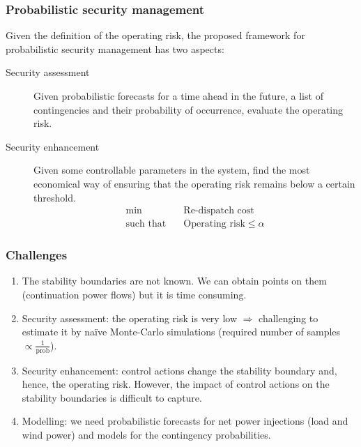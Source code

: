 \documentclass{beamer}
\begin{document}
\begin{frame}
\end{frame}

\begin{frame}
  \frametitle{Probabilistic security management}
  Given the definition of the operating risk, the proposed framework for probabilistic security management has two aspects:
  \begin{description}
  \item[Security assessment] Given probabilistic forecasts for a time ahead in the future, a list of contingencies and their probability of occurrence, evaluate the operating risk.
  \item[Security enhancement] Given some controllable parameters in the system, find the most economical way of ensuring that the operating risk remains below a certain threshold. 
    \begin{align*}
      \min \quad & \text{Re-dispatch cost} \\
      \text{such that} \quad & \text{Operating risk} \leq \alpha
    \end{align*}
  \end{description}
\end{frame}

\begin{frame}
  \frametitle{Challenges}
  \begin{enumerate}
  \item The stability boundaries are not known. We can obtain points on them (continuation power flows) but it is time consuming.
  \item Security assessment: the operating risk is very low $\Rightarrow$ challenging to estimate it by naïve Monte-Carlo simulations (required number of samples $\propto \frac{1}{\text{prob}}$).
  \item Security enhancement: control actions change the stability boundary and, hence, the operating risk. However, the impact of control actions on the stability boundaries is difficult to capture.
  \item Modelling: we need probabilistic forecasts for net power injections (load and wind power) and models for the contingency probabilities.
  \end{enumerate}
\end{frame}
\end{document}
